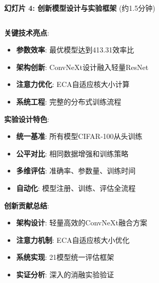 \documentclass[10pt]{beamer}
\begin{document}
\begin{frame}{\textbf{幻灯片 4: 创新模型设计与实验框架} (约1.5分钟)}
{\begin{columns}[T]
\begin{column}{0.48\textwidth}
        \textbf{关键技术亮点}:
        \begin{itemize}
            \item \textbf{参数效率}: 最优模型达到413.31效率比
            \item \textbf{架构创新}: ConvNeXt设计融入轻量ResNet
            \item \textbf{注意力优化}: ECA自适应核大小计算
            \item \textbf{系统工程}: 完整的分布式训练流程
        \end{itemize}
        
        \textbf{实验设计特色}:
        \begin{itemize}
            \item \textbf{统一基准}: 所有模型CIFAR-100从头训练
            \item \textbf{公平对比}: 相同数据增强和训练策略
            \item \textbf{多维评估}: 准确率、参数量、训练时间
            \item \textbf{自动化}: 模型注册、训练、评估全流程
        \end{itemize}
        
        \textbf{创新贡献总结}:
        \begin{itemize}
            \item \textbf{架构设计}: 轻量高效的ConvNeXt融合方案
            \item \textbf{注意力机制}: ECA自适应核大小优化
            \item \textbf{系统实现}: 21模型统一评估框架
            \item \textbf{实证分析}: 深入的消融实验验证
        \end{itemize}
    \end{column}
\end{columns}
}

\end{frame}
\end{document}
